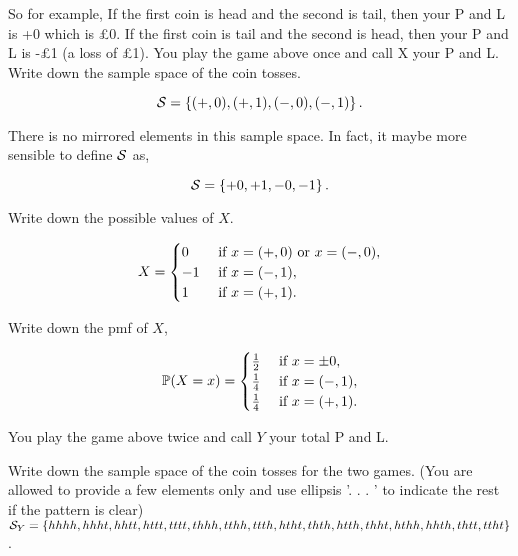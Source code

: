 \documentclass{article}
\begin{document}
        So for example, If the first coin is head and the second is tail, then your P and L is +0 which is £0. If the first coin is tail and the second is head, then your P and L is -£1 (a loss of £1). You play the game above once and call X your P and L.\\

            Write down the sample space of the coin tosses.\\

            \ans

            \[\mathcal{S} = \left\{ (+, 0), (+, 1), (-, 0), (-, 1) \right\}.\]

            There is no mirrored elements in this sample space. In fact, it maybe more sensible to define $\mathcal{S}$ as,

            \[\mathcal{S} = \left\{ +0, +1, -0, -1 \right\}.\]

            Write down the possible values of $X$.\\

            \ans 

            \[X = \begin{cases}
                0& \text{ if } x = (+, 0) \text{ or } x = (-, 0),\\
                -1& \text{ if } x = (-, 1),\\
                1& \text{ if } x = (+, 1).
            \end{cases}\]

            Write down the pmf of $X$,\\

            \ans

            \[\mathbb{P}(X = x) = \begin{cases}
                \frac{1}{2}& \text{ if } x = \pm0,\\
                \frac{1}{4}& \text{ if } x = (-, 1),\\
                \frac{1}{4}& \text{ if } x = (+, 1).
            \end{cases}\]

            You play the game above twice and call $Y$ your total P and L.

            Write down the sample space of the coin tosses for the two games. (You are allowed to provide a few elements only and use ellipsis '. . . ' to indicate the rest if the pattern is clear)\\

            \ans  $\mathcal{S}_Y = \left\{ hhhh, hhht, hhtt, httt, tttt, thhh, tthh, ttth, htht, thth, htth, thht, hthh, hhth, thtt, ttht\right\}$.
\end{document}
